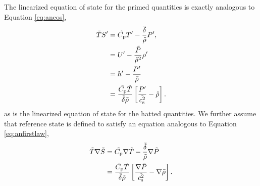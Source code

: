 \documentclass[12pt]{article}
\begin{document}
The linearized equation of state for the primed quantities is exactly analogous to Equation \eqref{eq:aneos},
\begin{subequations}\label{eq:aneosref}
	\begin{align}
		\tilde{T} S^\prime &= \tilde{C_{\rm{p}}} T^\prime - \frac{\tilde{\delta}}{\tilde{\rho}} P^\prime,\\
		&= U^\prime - \frac{\tilde{P}}{\tilde{\rho}^2}\rho^\prime \\
	&= h^\prime - \frac{P^\prime }{\tilde{\rho}}\\
		&= \frac{\tilde{C_{\rm{p}}} \tilde{T}}{\tilde{\delta}\tilde{\rho}}\left[\frac{P^\prime}{\tilde{c_{\rm s}^2}}-\hat{\rho}\right].
	\end{align}
\end{subequations}
as is the linearized equation of state for the hatted quantities. We further assume that reference state is defined to satisfy an equation analogous to Equation \eqref{eq:anfirstlaw},
\begin{subequations}\label{eq:anfirstlawref}
	\begin{align}
		\tilde{T}\nabla\tilde{S} &= \tilde{C_{\rm{p}}}\nabla\tilde{T} - \frac{\tilde{\delta}}{\tilde{\rho}}\nabla\tilde{P} \\
		&= \frac{\tilde{C_{\rm{p}}}\tilde{T}}{\tilde{\delta}\tilde{\rho}}\left[\frac{\nabla\tilde{P}}{\tilde{c_{\rm s}^2}}-\nabla\tilde{\rho}\right].
	\end{align}
\end{subequations}
\end{document}
